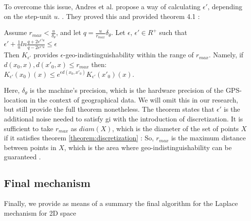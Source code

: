 To overcome this issue, Andres et al. propose a way of calculating $\epsilon'$, depending on the step-unit $u$. \citep{DBLP:journals/corr/abs-1212-1984}.
They proved this and provided theorem 4.1 \citep{DBLP:journals/corr/abs-1212-1984}:
\begin{theorem}
  Assume $r_{max} < \frac{u}{\delta_{\theta}}$, and let $q = \frac{u}{r_{max}}\delta_{\theta}$. Let $\epsilon$, $\epsilon' \in R^+$ such that \\
  $\epsilon' + \frac{1}{u}ln \frac{q + 2 e^{\epsilon'u}}{q - 2 e^{\epsilon'u}} \leq \epsilon$ \\
  Then $K_{\epsilon'}$ provides $\epsilon$-geo-indistinguishability within the range of $r_{max}$. Namely, if ${d(x_0, x), d(x'_0, x) \leq r_{max}}$ then: \\
  $K_{\epsilon'}(x_0)(x) \leq e^{\epsilon d(x_0, x'_{0})} K_{\epsilon'}(x'_{0})(x)$.
  \label{theorem:discretization}
\end{theorem}
Here, $\delta_{\theta}$ is the machine's precision, which is the hardware precision of the GPS-location in the context of geographical data. We will omit this in our research, but still provide the full theorem nonetheless.
The theorem states that $\epsilon'$ is the additional noise needed to satisfy \gls{gi} with the introduction of discretization.
It is sufficient to take $r_{max}$ as $diam(X)$, which is the diameter of the set of points $X$ if it satisfies theorem \ref{theorem:discretization} \citep{DBLP:journals/corr/abs-1212-1984}:
So, $r_{max}$ is the maximum distance between points in $X$, which is the area where geo-indistinguishability can be guaranteed \citep{9646489}.
\newpage
\subsection{Final mechanism}
Finally, we provide as means of a summary the final algorithm for the Laplace mechanism for 2D space

\newpage